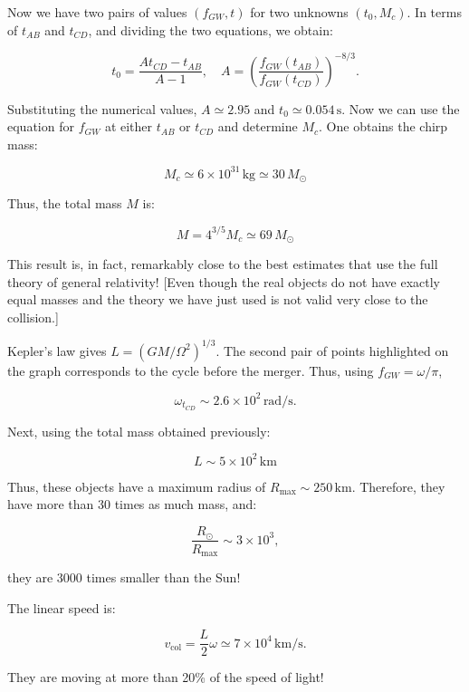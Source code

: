 \documentclass[11pt]{article}
\begin{document}
\begin{pproblem}
\begin{pssolution*}{}{}
\begin{alternativas}
        Now we have two pairs of values $(f_{GW}, t)$ for two unknowns $(t_0, M_c)$. In terms of $t_{AB}$ and $t_{CD}$, and dividing the two equations, we obtain:
        
        \[
        t_0 = \frac{A t_{CD} - t_{AB}}{A - 1}, \quad A = \left( \frac{f_{GW}(t_{AB})}{f_{GW}(t_{CD})} \right)^{-8/3}.
        \]
        
        Substituting the numerical values, $A \simeq 2.95$ and $t_0 \simeq 0.054 \, \text{s}$. Now we can use the equation for \(f_{GW}\) at either $t_{AB}$ or $t_{CD}$ and determine $M_c$. One obtains the chirp mass:
        
        \[
        M_c \simeq 6 \times 10^{31} \, \text{kg} \simeq 30 \, M_\odot\]
        
        Thus, the total mass $M$ is:
        
        \[
        M = 4^{3/5} M_c \simeq 69 \, M_\odot
        \]
        
        This result is, in fact, remarkably close to the best estimates that use the full theory of general relativity! [Even though the real objects do not have exactly equal masses and the theory we have just used is not valid very close to the collision.]
    
        \item Kepler's law gives $L = (GM / \Omega^2)^{1/3}$. The second pair of points highlighted on the graph corresponds to the cycle before the merger. Thus, using \(f_{GW} = \omega/\pi\),

        \[
        \omega_{t_{CD}} \sim 2.6 \times 10^2 \, \text{rad/s}.
        \]
        
        Next, using the total mass obtained previously:
        
        \[
        L \sim 5 \times 10^2 \, \text{km}
        \]
        
        Thus, these objects have a maximum radius of $R_{\text{max}} \sim 250 \, \text{km}$. Therefore, they have more than 30 times as much mass, and:
        
        \[
        \frac{R_\odot}{R_{\text{max}}} \sim 3 \times 10^3,
        \]
        
        they are 3000 times smaller than the Sun!
        
        The linear speed is:
        
        \[
        v_{\text{col}} = \frac{L}{2} \omega \simeq 7 \times 10^4 \, \text{km/s}. 
        \]
        
        They are moving at more than 20\% of the speed of light!
        

\end{alternativas}
\end{pssolution*}
\end{pproblem}
\end{document}

